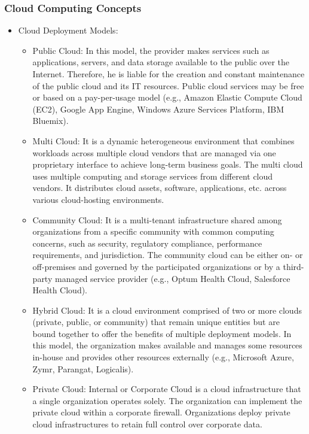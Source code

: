 \subsubsection{Cloud Computing Concepts}
\begin{itemize}
    \item Cloud Deployment Models:
    \begin{itemize}
        \item Public Cloud: In this model, the provider makes services such as applications, servers, and data storage available to the public over the Internet. Therefore, he is liable for the creation and constant maintenance of the public cloud and its IT resources. Public cloud services may be free or based on a pay-per-usage model (e.g., Amazon Elastic Compute Cloud (EC2), Google App Engine, Windows Azure Services Platform, IBM Bluemix).
        \item Multi Cloud: It is a dynamic heterogeneous environment that combines workloads across multiple cloud vendors that are managed via one proprietary interface to achieve long-term business goals. The multi cloud uses multiple computing and storage services from different cloud vendors. It distributes cloud assets, software, applications, etc. across various cloud-hosting environments.
        \item Community Cloud: It is a multi-tenant infrastructure shared among organizations from a specific community with common computing concerns, such as security, regulatory compliance, performance requirements, and jurisdiction. The community cloud can be either on- or off-premises and governed by the participated organizations or by a third-party managed service provider (e.g., Optum Health Cloud, Salesforce Health Cloud).
        \item Hybrid Cloud: It is a cloud environment comprised of two or more clouds (private, public, or community) that remain unique entities but are bound together to offer the benefits of multiple deployment models. In this model, the organization makes available and manages some resources in-house and provides other resources externally (e.g., Microsoft Azure, Zymr, Parangat, Logicalis).
        \item Private Cloud: Internal or Corporate Cloud is a cloud infrastructure that a single organization operates solely. The organization can implement the private cloud within a corporate firewall. Organizations deploy private cloud infrastructures to retain full control over corporate data.
    \end{itemize}

\end{itemize}
